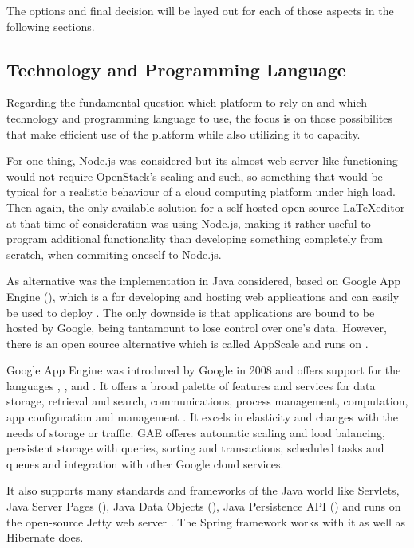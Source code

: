 The options and final decision will be layed out for each of those aspects in the following sections.

\subsection{Technology and Programming Language}
\label{subsec:technology-programming-language}
Regarding the fundamental question which platform to rely on and which technology and programming language to use, the focus is on those possibilites that make efficient use of the  platform while also utilizing it to capacity. 

For one thing, Node.js was considered but its almost web-server-like functioning would not require OpenStack's scaling and such, so something that would be typical for a realistic behaviour of a cloud computing platform under high load. Then again, the only available solution for a self-hosted open-source \LaTeX editor at that time of consideration was  using Node.js, making it rather useful to program additional functionality than developing something completely from scratch, when commiting oneself to Node.js.

As alternative was the implementation in Java considered, based on Google App Engine (), which is a  for developing and hosting web applications and can easily be used to deploy  \cite{website:appengine}. The only downside is that applications are bound to be hosted by Google, being tantamount to lose control over one's data. However, there is an open source alternative which is called AppScale and runs on  \cite{website:appscale}.

Google App Engine was introduced by Google in 2008 and offers support for the languages , ,  and . It offers a broad palette of features and services for data storage, retrieval and search, communications, process management, computation, app configuration and management \cite{website:appengine-features}. It excels in elasticity and changes with the needs of storage or traffic. GAE offeres automatic scaling and load balancing, persistent storage with queries, sorting and transactions, scheduled tasks and queues and integration with other Google cloud services.

It also supports many standards and frameworks of the Java world like Servlets, Java Server Pages (), Java Data Objects (), Java Persistence API () and runs on the open-source Jetty web server \cite{website:jetty}. The Spring framework works with it as well as Hibernate does.

